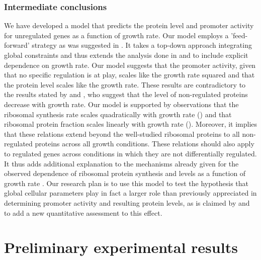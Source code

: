 \documentclass[a4page,notitlepage]{article}
\begin{document}
\subsubsection{Intermediate conclusions}
We have developed a model that predicts the protein level and promoter activity for unregulated genes as a function of growth rate.
Our model employs a 'feed-forward' strategy as was suggested in \cite{Levy2009}.
It takes a top-down approach integrating global constraints and thus extends the analysis done in \cite{Leeat2013} and \cite{Maaloe1969} to include explicit dependence on growth rate.
Our model suggests that the promoter activity, given that no specific regulation is at play, scales like the growth rate squared and that the protein level scales like the growth rate.
These results are contradictory to the results stated by \cite{Klumpp2009a} and \cite{Scott2010b}, who suggest that the level of non-regulated proteins decrease with growth rate.
Our model is supported by observations that the ribosomal synthesis rate scales quadratically with growth rate (\cite{Zaslaver2009a}) and that ribosomal protein fraction scales linearly with growth rate (\cite{Maaloe1969,ingraham1983growth}).
Moreover, it implies that these relations extend beyond the well-studied ribosomal proteins to all non-regulated proteins across all growth conditions.
These relations should also apply to regulated genes across conditions in which they are not differentially regulated.
It thus adds additional explanation to the mechanisms already given for the observed dependence of ribosomal protein synthesis and levels as a function of growth rate \cite{Zaslaver2009a}.
Our research plan is to use this model to test the hypothesis that global cellular parameters play in fact a larger role than previously appreciated in determining promoter activity and resulting protein levels, as is claimed by \cite{Berthoumieux2013,Leeat2013,loven2012,Scott2010b,Klumpp2009a} and to add a new quantitative assessment to this effect.
\section{Preliminary experimental results}
\end{document}

